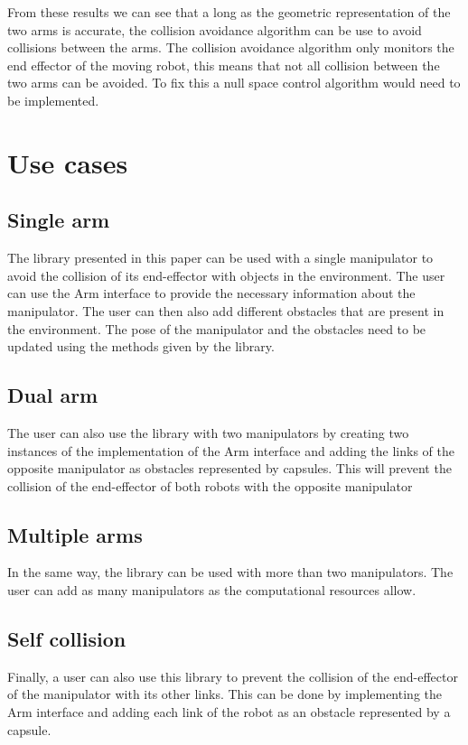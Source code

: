 \documentclass[a4paper, 10pt, conference]{ieeeconf}      %
\begin{document}
\pagebreak
From these results we can see that a long as the geometric representation of the two arms is accurate, the collision avoidance algorithm can be use to avoid collisions between the arms. The collision avoidance algorithm only monitors the end effector of the moving robot, this means that not all collision between the two arms can be avoided. To fix this a null space control algorithm would need to be implemented. 

\section{Use cases}

\subsection{Single arm} %
The library presented in this paper can be used with a single manipulator to avoid the collision of its end-effector with objects in the environment.
The user can use the Arm interface to provide the necessary information about the manipulator.
The user can then also add different obstacles that are present in the environment.
The pose of the manipulator and the obstacles need to be updated using the methods given by the library.
\subsection{Dual arm} %
The user can also use the library with two manipulators by creating two instances of the implementation of the Arm interface and adding the links of 
the opposite manipulator as obstacles represented by capsules.
This will prevent the collision of the end-effector of both robots with the opposite manipulator
\subsection{Multiple arms}
In the same way, the library can be used with more than two manipulators. The user can add as many manipulators as the computational resources allow.
\subsection{Self collision} %
Finally, a user can also use this library to prevent the collision of the end-effector of the manipulator with its other links.
This can be done by implementing the Arm interface and adding each link of the robot as an obstacle represented by a capsule.
\end{document}
